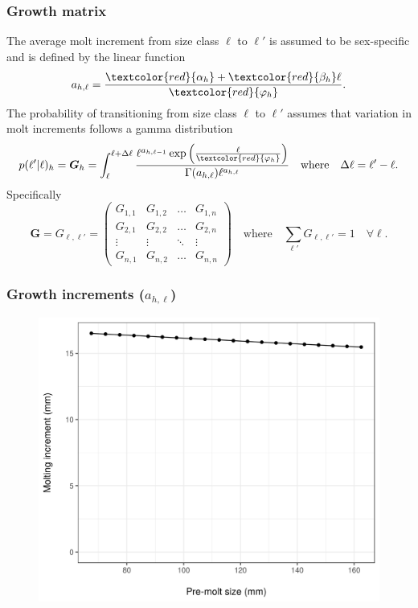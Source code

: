 \documentclass{beamer}
\begin{document}

\begin{frame}
\frametitle{Growth matrix}
The average molt increment from size class $\ell$ to $\ell'$ is assumed to be
sex-specific and is defined by the linear function
\begin{equation*}
  a_{h,\ell} = \frac{\textcolor{red}{\alpha_h} + \textcolor{red}{\beta_h}
    \ell}{\textcolor{red}{\varphi_h}}.
\end{equation*}
The probability of transitioning from size class $\ell$ to $\ell'$ assumes that
variation in molt increments follows a gamma distribution
\begin{equation*}
  p (\ell'|\ell)_h = \boldsymbol{G}_h = \int^{\ell + \Delta \ell}_\ell \frac{\ell^{a_{h,\ell-1}} \exp
    \left(\frac{\ell}{\textcolor{red}{\varphi_h}} \right)}{\Gamma (a_{h,\ell}) \ell^{a_{h,\ell}}}
  \quad \text{where} \quad \Delta \ell = \ell' - \ell.
\end{equation*}
Specifically
\begin{equation*}
  \boldsymbol{G} = G_{\ell,\ell'} = \left( \begin{array}{cccc}
      G_{1,1} & G_{1,2} & \hdots & G_{1,n} \\
      G_{2,1} & G_{2,2} & \hdots & G_{2,n} \\
      \vdots & \vdots & \ddots & \vdots \\
      G_{n,1} & G_{n,2} & \hdots & G_{n,n} \end{array} \right)
  \quad \text{where} \quad \sum_{\ell'} G_{\ell,\ell'} = 1 \quad \forall \ell.
\end{equation*}
\end{frame}


\begin{frame}
\frametitle{Growth increments ($a_{h,\ell}$)}
\begin{figure}[!htbp]
  \centering
  \includegraphics[width=0.75\linewidth]{../../examples/bbrkc/OneSex/figure/gi.png}
\end{figure}
\end{frame}
\end{document}
